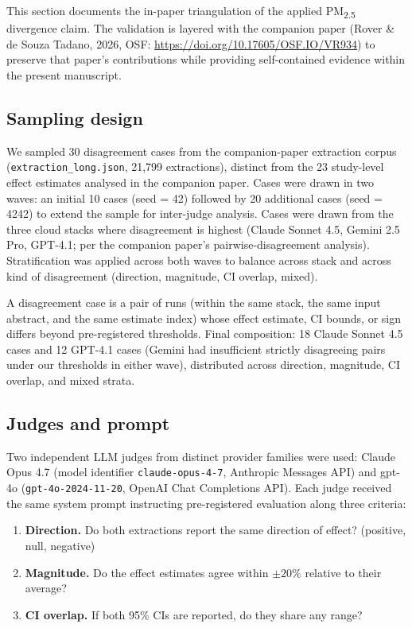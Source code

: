 \documentclass[11pt]{article}
\begin{document}
This section documents the in-paper triangulation of the applied PM\textsubscript{2.5} divergence claim. The validation is layered with the companion paper (Rover \& de Souza Tadano, 2026, OSF: \url{https://doi.org/10.17605/OSF.IO/VR934}) to preserve that paper's contributions while providing self-contained evidence within the present manuscript.

\subsection{Sampling design}

We sampled 30 disagreement cases from the companion-paper extraction corpus (\texttt{extraction\_long.json}, 21{,}799 extractions), distinct from the 23 study-level effect estimates analysed in the companion paper. Cases were drawn in two waves: an initial 10 cases (seed = 42) followed by 20 additional cases (seed = 4242) to extend the sample for inter-judge analysis. Cases were drawn from the three cloud stacks where disagreement is highest (Claude Sonnet 4.5, Gemini 2.5 Pro, GPT-4.1; per the companion paper's pairwise-disagreement analysis). Stratification was applied across both waves to balance across stack and across kind of disagreement (direction, magnitude, CI overlap, mixed).

A disagreement case is a pair of runs (within the same stack, the same input abstract, and the same estimate index) whose effect estimate, CI bounds, or sign differs beyond pre-registered thresholds. Final composition: 18 Claude Sonnet 4.5 cases and 12 GPT-4.1 cases (Gemini had insufficient strictly disagreeing pairs under our thresholds in either wave), distributed across direction, magnitude, CI overlap, and mixed strata.

\subsection{Judges and prompt}

Two independent LLM judges from distinct provider families were used: Claude Opus 4.7 (model identifier \texttt{claude-opus-4-7}, Anthropic Messages API) and gpt-4o (\texttt{gpt-4o-2024-11-20}, OpenAI Chat Completions API). Each judge received the same system prompt instructing pre-registered evaluation along three criteria:

\begin{enumerate}[leftmargin=*]
    \item \textbf{Direction.} Do both extractions report the same direction of effect? (positive, null, negative)
    \item \textbf{Magnitude.} Do the effect estimates agree within $\pm 20\%$ relative to their average?
    \item \textbf{CI overlap.} If both 95\% CIs are reported, do they share any range?
\end{enumerate}
\end{document}
